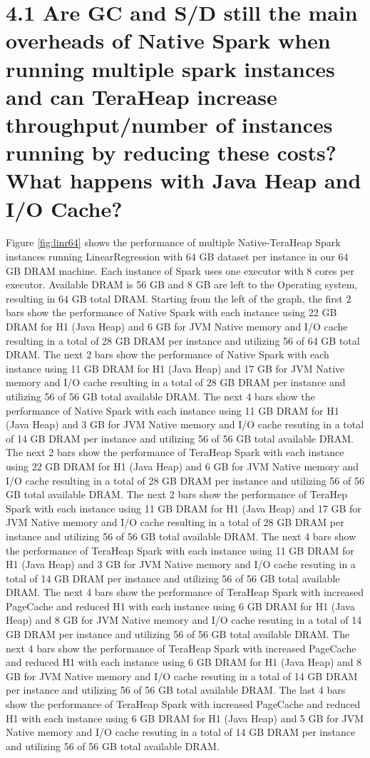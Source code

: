 \documentclass[twocolumn,10pt]{asme2e}
\begin{document}
\section*{4.1 Are GC and S/D still the main overheads of Native Spark when running multiple spark instances and can TeraHeap increase throughput/number of instances running by reducing these costs? What happens with Java Heap and I/O Cache?}

Figure \ref{fig:linr64} shows the performance of multiple Native-TeraHeap Spark instances running LinearRegression with 64 GB dataset per instance in our 64 GB DRAM machine. Each instance of Spark uses one executor with 8 cores per executor. Available DRAM is 56 GB and 8 GB are left to the Operating system, resulting in 64 GB total DRAM. Starting from the left of the graph, the first 2 bars show the performance of Native Spark with each instance using 22 GB DRAM for H1 (Java Heap) and 6 GB for JVM Native memory and I/O cache resulting in a total of 28 GB DRAM per instance and utilizing 56 of 64 GB total DRAM. The next 2 bars show the performance of Native Spark with each instance using 11 GB DRAM for H1 (Java Heap) and 17 GB for JVM Native memory and I/O cache resulting in a total of 28 GB DRAM per instance and utilizing 56 of 56 GB total available DRAM. The next 4 bars show the performance of Native Spark with each instance using 11 GB DRAM for H1 (Java Heap) and 3 GB for JVM Native memory and I/O cache resuting in a total of 14 GB DRAM per instance and utilizing 56 of 56 GB total available DRAM. 
The next 2 bars show the performance of TeraHeap Spark with each instance using 22 GB DRAM for H1 (Java Heap) and 6 GB for JVM Native memory and I/O cache resulting in a total of 28 GB DRAM per instance and utilizing 56 of 56 GB total available DRAM. The next 2 bars show the performance of TeraHep Spark with each instance using 11 GB DRAM for H1 (Java Heap) and 17 GB for JVM Native memory and I/O cache resulting in a total of 28 GB DRAM per instance and utilizing 56 of 56 GB total available DRAM. The next 4 bars show the performance of TeraHeap Spark with each instance using 11 GB DRAM for H1 (Java Heap) and 3 GB for JVM Native memory and I/O cache resuting in a total of 14 GB DRAM per instance and utilizing 56 of 56 GB total available DRAM. The next 4 bars show the performance of TeraHeap Spark with increased PageCache and reduced H1 with each instance using 6 GB DRAM for H1 (Java Heap) and 8 GB for JVM Native memory and I/O cache resuting in a total of 14 GB DRAM per instance and utilizing 56 of 56 GB total available DRAM. The next 4 bars show the performance of TeraHeap Spark with increased PageCache and reduced H1 with each instance using 6 GB DRAM for H1 (Java Heap) and 8 GB for JVM Native memory and I/O cache resuting in a total of 14 GB DRAM per instance and utilizing 56 of 56 GB total available DRAM. The last 4 bars show the performance of TeraHeap Spark with increased PageCache and reduced H1 with each instance using 6 GB DRAM for H1 (Java Heap) and 5 GB for JVM Native memory and I/O cache resuting in a total of 14 GB DRAM per instance and utilizing 56 of 56 GB total available DRAM.
\end{document}
